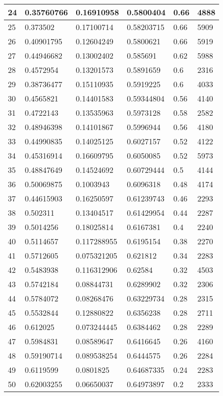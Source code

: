 \begin{longtable}{|l|l|l|l|l|l|}
24 & 0.35760766 & 0.16910958 & 0.5800404 & 0.66 & 4888 \\ \hline 
25 & 0.373502 & 0.17100714 & 0.58203715 & 0.66 & 5909 \\ \hline 
26 & 0.40901795 & 0.12604249 & 0.5800621 & 0.66 & 5919 \\ \hline 
27 & 0.44946682 & 0.13002402 & 0.585691 & 0.62 & 5988 \\ \hline 
28 & 0.4572954 & 0.13201573 & 0.5891659 & 0.6 & 2316 \\ \hline 
29 & 0.38736477 & 0.15110935 & 0.5919225 & 0.6 & 4033 \\ \hline 
30 & 0.4565821 & 0.14401583 & 0.59344804 & 0.56 & 4140 \\ \hline 
31 & 0.4722143 & 0.13535963 & 0.5973128 & 0.58 & 2582 \\ \hline 
32 & 0.48946398 & 0.14101867 & 0.5996944 & 0.56 & 4180 \\ \hline 
33 & 0.44990835 & 0.14025125 & 0.6027157 & 0.52 & 4122 \\ \hline 
34 & 0.45316914 & 0.16609795 & 0.6050085 & 0.52 & 5973 \\ \hline 
35 & 0.48847649 & 0.14524692 & 0.60729444 & 0.5 & 4144 \\ \hline 
36 & 0.50069875 & 0.1003943 & 0.6096318 & 0.48 & 4174 \\ \hline 
37 & 0.44615903 & 0.16250597 & 0.61239743 & 0.46 & 2293 \\ \hline 
38 & 0.502311 & 0.13404517 & 0.61429954 & 0.44 & 2287 \\ \hline 
39 & 0.5014256 & 0.18025814 & 0.6167381 & 0.4 & 2240 \\ \hline 
40 & 0.5114657 & 0.117288955 & 0.6195154 & 0.38 & 2270 \\ \hline 
41 & 0.5712605 & 0.075321205 & 0.621812 & 0.34 & 2283 \\ \hline 
42 & 0.5483938 & 0.116312906 & 0.62584 & 0.32 & 4503 \\ \hline 
43 & 0.5742184 & 0.08844731 & 0.6289902 & 0.32 & 2306 \\ \hline 
44 & 0.5784072 & 0.08268476 & 0.63229734 & 0.28 & 2315 \\ \hline 
45 & 0.5532844 & 0.12880822 & 0.6356238 & 0.28 & 2711 \\ \hline 
46 & 0.612025 & 0.073244445 & 0.6384462 & 0.28 & 2289 \\ \hline 
47 & 0.5984831 & 0.08589647 & 0.6416645 & 0.26 & 4160 \\ \hline 
48 & 0.59190714 & 0.089538254 & 0.6444575 & 0.26 & 2284 \\ \hline 
49 & 0.6119599 & 0.0801825 & 0.64687335 & 0.24 & 2283 \\ \hline 
50 & 0.62003255 & 0.06650037 & 0.64973897 & 0.2 & 2333 \\ \hline 
\end{longtable}